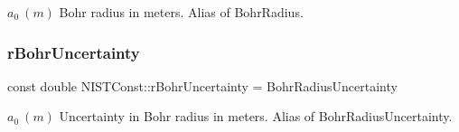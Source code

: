 $a_0 \ (m)$ Bohr radius in meters. Alias of Bohr\+Radius. \mbox{\label{group___bohr_radius_ga5cbe12af6cb3e4962e629970564c7905}} 
\subsubsection{\texorpdfstring{r\+Bohr\+Uncertainty}{rBohrUncertainty}}
{\footnotesize\ttfamily const double N\+I\+S\+T\+Const\+::r\+Bohr\+Uncertainty = Bohr\+Radius\+Uncertainty}

$a_0 \ (m)$ Uncertainty in Bohr radius in meters. Alias of Bohr\+Radius\+Uncertainty. 